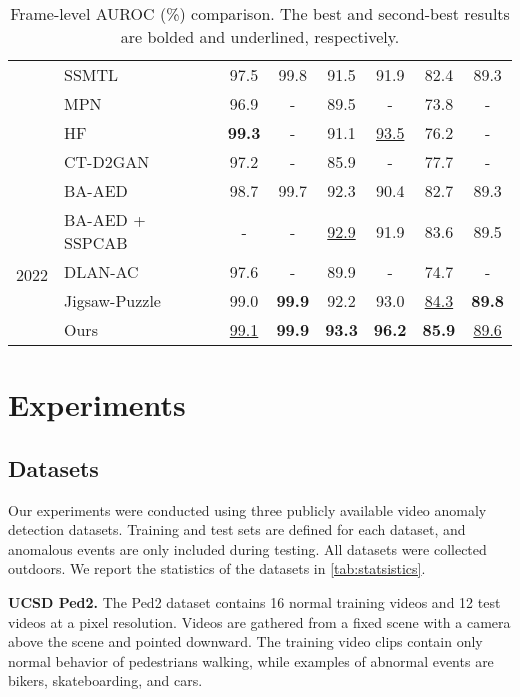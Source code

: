 \documentclass[10pt,twocolumn,letterpaper]{article}
\begin{document}
\begin{table*}[t]
\begin{tabular}{| c | l | c | c | c | c | c | c |}
& SSMTL \cite{Georgescu2021AnomalyDI}  & 97.5 & 99.8 & 91.5 & 91.9 & 82.4 & 89.3 \\
& MPN \cite{Lv_2021_CVPR}  & 96.9 & - & 89.5 & - & 73.8 & - \\
& HF \cite{Liu_2021_ICCV} & \textbf{99.3} & - & 91.1 & \underline{93.5} & 76.2 & -\\
& CT-D2GAN \cite{Feng2021ConvolutionalTB} & 97.2 & - & 85.9 & - & 77.7 & -\\
& BA-AED \cite{georgescu2021tpami}  & 98.7 & 99.7 & 92.3 & 90.4 & 82.7 & 89.3 \\
\hline
\multirow{4}{*}{2022} & BA-AED \cite{georgescu2021tpami} + SSPCAB \cite{attentive_block_cvpr2022} & - & - & \underline{92.9} & 91.9 & 83.6 & 89.5 \\
& DLAN-AC \cite{eccv2022_dynamic} & 97.6 & - & 89.9 & - & 74.7 & - \\
& Jigsaw-Puzzle \cite{jigsaw_puzzles_eccv2022} & 99.0 & \textbf{99.9} & 92.2 & 93.0 & \underline{84.3} & \textbf{89.8} \\
\cline{2-8}
& Ours & \underline{99.1} & \textbf{99.9} & \textbf{93.3} & \textbf{96.2} & \textbf{85.9} & \underline{89.6}\\
\hline
\end{tabular}
\caption{Frame-level AUROC (\%) comparison. The best and second-best results are bolded and underlined, respectively.}
	\label{tab:AUC_compare}
\end{table*}


\section{Experiments}

\subsection{Datasets}
Our experiments were conducted using three publicly available video anomaly detection datasets. Training and test sets are defined for each dataset, and anomalous events are only included during testing. All datasets were collected outdoors. We report the statistics of the datasets in \cref{tab:statsistics}.

\textbf{UCSD Ped2.} The Ped2 dataset \cite{ped2} contains 16 normal training videos and 12 test videos at a  pixel resolution. Videos are gathered from a fixed scene with a camera above the scene and pointed downward. The training video clips contain only normal behavior of pedestrians walking, while examples of abnormal events are bikers, skateboarding, and cars. 
\end{document}
